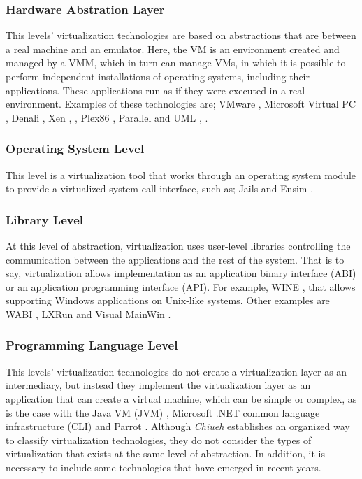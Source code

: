 	\subsubsection{Hardware Abstration Layer}
	
	This levels' virtualization technologies are based on abstractions that are between a real machine and an emulator. Here, the VM is an environment created and managed by a VMM, which in turn can manage VMs, in which it is possible to perform independent installations of operating systems, including their applications. These applications run as if they were executed in a real environment. Examples of these technologies are; VMware \cite{VMware2018Website}, Microsoft Virtual PC \cite{Honeycutt2003}, Denali \cite {Whitaker2002}, Xen \cite{Xen2018Website} \cite{Barham2003}, \cite{Xen2018WebsiteCambridge}, Plex86 \cite{Plex86}, Parallel \cite{Parallels2018} and UML \cite{Dike2006}, \cite{UML2006Website}. 
	
	\subsubsection{Operating System Level}
	
	This level is a virtualization tool that works through an operating system module to provide a virtualized system call interface,  such as; Jails \cite{Biederman2006} and Ensim \cite{Ensim}.
	
	\subsubsection{Library Level}
	
	At this level of abstraction, virtualization uses user-level libraries controlling the communication between the applications and the rest of the system. 
	That is to say, virtualization allows implementation as  an application binary interface (ABI) or an application programming interface (API). 
	For example, WINE \cite{Wine}, that allows supporting Windows applications on Unix-like systems. 
	Other examples are WABI \cite{WABI}, LXRun \cite{LXRUN} and Visual MainWin \cite{Fisher2006}.

	\subsubsection{Programming Language Level}
	
	This levels' virtualization technologies do not create a virtualization layer as an intermediary, but instead they implement the virtualization layer as an application that can create a virtual machine, which can be simple or complex, as is the case with the Java VM  (JVM) \cite{Lindholm1997}, Microsoft .NET common language infrastructure (CLI) \cite{Thai2003} and Parrot \cite {Parrot}. Although \textit{Chiueh} \cite{Chiueh2005} establishes an organized way to classify virtualization technologies, they do not consider the types of virtualization that exists at the same level of abstraction. In addition, it is necessary to include some technologies that have emerged in recent years.